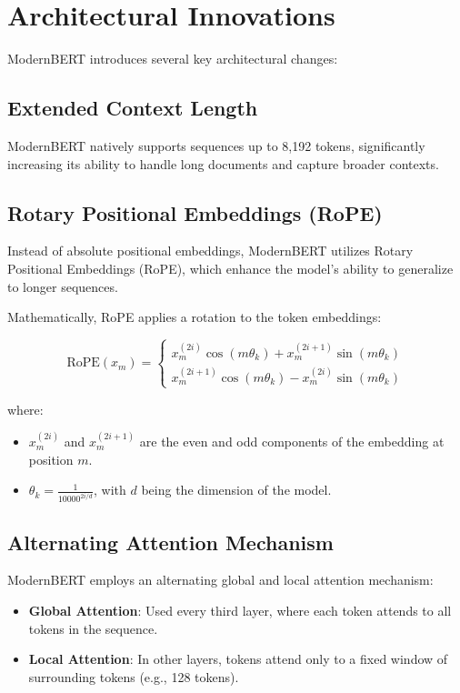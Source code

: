 \documentclass{article}
\begin{document}
\section{Architectural Innovations}  
  
ModernBERT introduces several key architectural changes:  
  
\subsection{Extended Context Length}  
  
ModernBERT natively supports sequences up to 8,192 tokens, significantly increasing its ability to handle long documents and capture broader contexts.  
  
\subsection{Rotary Positional Embeddings (RoPE)}  
  
Instead of absolute positional embeddings, ModernBERT utilizes Rotary Positional Embeddings (RoPE), which enhance the model's ability to generalize to longer sequences.  
  
Mathematically, RoPE applies a rotation to the token embeddings:  
  
\[  
\text{RoPE}(x_m) = \begin{cases}  
x_m^{(2i)} \cos(m \theta_k) + x_m^{(2i+1)} \sin(m \theta_k) \\  
x_m^{(2i+1)} \cos(m \theta_k) - x_m^{(2i)} \sin(m \theta_k)  
\end{cases}  
\]  
  
where:  
  
\begin{itemize}  
    \item \( x_m^{(2i)} \) and \( x_m^{(2i+1)} \) are the even and odd components of the embedding at position \( m \).  
    \item \( \theta_k = \frac{1}{10000^{2i/d}} \), with \( d \) being the dimension of the model.  
\end{itemize}  
  
\subsection{Alternating Attention Mechanism}  
  
ModernBERT employs an alternating global and local attention mechanism:  
  
\begin{itemize}  
    \item \textbf{Global Attention}: Used every third layer, where each token attends to all tokens in the sequence.  
    \item \textbf{Local Attention}: In other layers, tokens attend only to a fixed window of surrounding tokens (e.g., 128 tokens).  
\end{itemize}  
  
\end{document}

